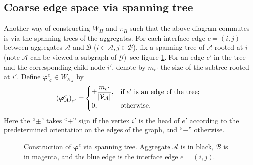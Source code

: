 \documentclass[ ]{elsarticle}
\newcommand{\cA}{\mathcal{A}}
\newcommand{\cB}{\mathcal{B}}
\newcommand{\cE}{\mathcal{E}}
\newcommand{\cG}{\mathcal{G}}
\newcommand{\cV}{\mathcal{V}}
\newcommand{\esp}{W}
\let\originalleft\left
\let\originalright\right
\renewcommand{\left}{\mathopen{}\mathclose\bgroup\originalleft}
\renewcommand{\right}{\aftergroup\egroup\originalright}
\numberwithin{equation}{section}
\begin{document}
\subsection{Coarse edge space via spanning tree}
Another way of constructing $\esp_H$ and $\pi_H$ such that the above
diagram commutes is via the spanning trees of the aggregates. For each
interface edge $e=(i,j)$ between aggregates $\cA$ and $\cB$
($i\in\cA, j\in\cB$), fix a spanning tree of $\cA$ rooted at $i$ (note
$\cA$ can be viewed a subgraph of $\cG$), see figure
\ref{fig:spanning-tree}. For an edge $e'$ in the tree and the
corresponding child node $i'$, denote by $m_{e'}$ the size of the
subtree rooted at $i'$. Define $\bm\varphi^e_\cA\in\esp_{\cE_\cA}$ by
\begin{equation*}
  \left(\bm\varphi^e_\cA\right)_{e'} = 
  \begin{cases}
    \pm\dfrac{m_{e'}}{\left\lvert\cV_\cA\right\rvert},
    & \text{if } e' \text{ is an edge of the tree;} \\
    0, & \text{otherwise.}
  \end{cases}
\end{equation*}
Here the ``$\pm$'' takes ``$+$'' sign if the vertex $i'$ is the head
of $e'$ according to the predetermined orientation on the edges of the
graph, and ``$-$'' otherwise.

\begin{figure}
  \centering
  \caption{Construction of $\bm\varphi^e$ via spanning tree. Aggregate
    $\cA$ is in black, $\cB$ is in magenta, and the blue edge is the
    interface edge $e=(i,j)$.}
  \label{fig:spanning-tree}
\end{figure}
\end{document}
